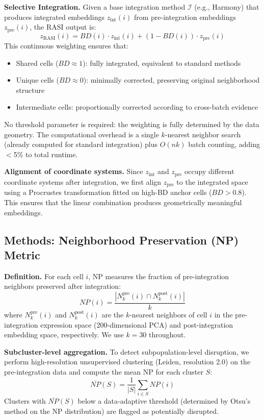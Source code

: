 \documentclass[10pt]{article}
\begin{document}
\textbf{Selective Integration.}
Given a base integration method $\mathcal{I}$ (e.g., Harmony) that produces integrated embeddings $z_{\text{int}}(i)$ from pre-integration embeddings $z_{\text{pre}}(i)$, the RASI output is:
\begin{equation}
z_{\text{RASI}}(i) = BD(i) \cdot z_{\text{int}}(i) + (1 - BD(i)) \cdot z_{\text{pre}}(i)
\end{equation}
This continuous weighting ensures that:
\begin{itemize}
\item Shared cells ($BD \approx 1$): fully integrated, equivalent to standard methods
\item Unique cells ($BD \approx 0$): minimally corrected, preserving original neighborhood structure
\item Intermediate cells: proportionally corrected according to cross-batch evidence
\end{itemize}

No threshold parameter is required: the weighting is fully determined by the data geometry. The computational overhead is a single $k$-nearest neighbor search (already computed for standard integration) plus $O(nk)$ batch counting, adding $<$5\% to total runtime.

\textbf{Alignment of coordinate systems.}
Since $z_{\text{int}}$ and $z_{\text{pre}}$ occupy different coordinate systems after integration, we first align $z_{\text{pre}}$ to the integrated space using a Procrustes transformation fitted on high-BD anchor cells ($BD > 0.8$). This ensures that the linear combination produces geometrically meaningful embeddings.

\subsection*{Methods: Neighborhood Preservation (NP) Metric}

\textbf{Definition.}
For each cell $i$, NP measures the fraction of pre-integration neighbors preserved after integration:
\begin{equation}
NP(i) = \frac{|N_k^{\text{pre}}(i) \cap N_k^{\text{post}}(i)|}{k}
\end{equation}
where $N_k^{\text{pre}}(i)$ and $N_k^{\text{post}}(i)$ are the $k$-nearest neighbors of cell $i$ in the pre-integration expression space (200-dimensional PCA) and post-integration embedding space, respectively. We use $k = 30$ throughout.

\textbf{Subcluster-level aggregation.}
To detect subpopulation-level disruption, we perform high-resolution unsupervised clustering (Leiden, resolution 2.0) on the pre-integration data and compute the mean NP for each cluster $S$:
\begin{equation}
\overline{NP}(S) = \frac{1}{|S|} \sum_{i \in S} NP(i)
\end{equation}
Clusters with $\overline{NP}(S)$ below a data-adaptive threshold (determined by Otsu's method on the NP distribution) are flagged as potentially disrupted.
\end{document}
